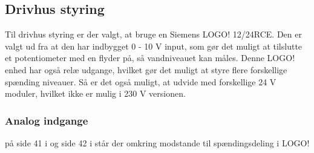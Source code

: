 \subsection{Drivhus styring}

Til drivhus styring er der valgt, at bruge en Siemens LOGO! 12/24RCE. 
Den er valgt ud fra at den har indbygget 0 - 10 V input, 
som gør det muligt at tilslutte et potentiometer med en flyder på, så vandniveauet kan måles.
Denne LOGO! enhed har også relæ udgange, hvilket gør det muligt at styre flere forskellige spænding niveauer.
Så er det også muligt, at udvide med forskellige 24 V moduler, hvilket ikke er mulig i 230 V versionen.

\subsubsection{Analog indgange}
på side 41 i \cite{logo_sm} og side 42 i \cite{logo_sm} står der omkring modstande til spændingsdeling i LOGO!